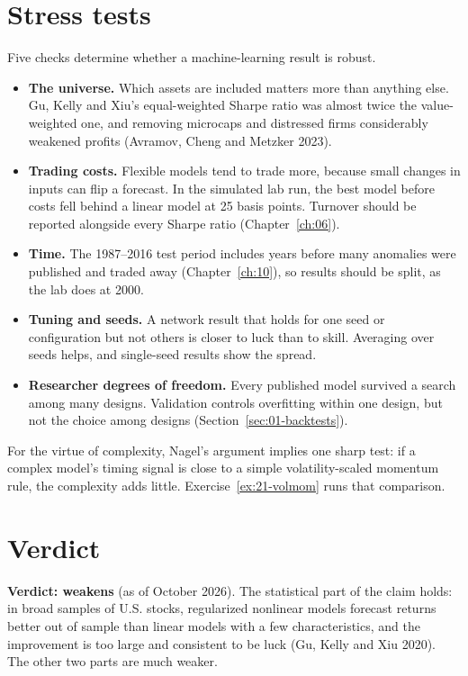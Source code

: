 \section{Stress tests}
\label{sec:21-stress}

Five checks determine whether a machine-learning result is robust.

\begin{itemize}
  \item \textbf{The universe.} Which assets are included matters more than anything else. Gu, Kelly and Xiu's equal-weighted Sharpe ratio was almost twice the value-weighted one, and removing microcaps and distressed firms considerably weakened profits (Avramov, Cheng and Metzker 2023).
  \item \textbf{Trading costs.} Flexible models tend to trade more, because small changes in inputs can flip a forecast. In the simulated lab run, the best model before costs fell behind a linear model at 25 basis points. Turnover should be reported alongside every Sharpe ratio (Chapter~\ref{ch:06}).
  \item \textbf{Time.} The 1987--2016 test period includes years before many anomalies were published and traded away (Chapter~\ref{ch:10}), so results should be split, as the lab does at 2000.
  \item \textbf{Tuning and seeds.} A network result that holds for one seed or configuration but not others is closer to luck than to skill. Averaging over seeds helps, and single-seed results show the spread.
  \item \textbf{Researcher degrees of freedom.} Every published model survived a search among many designs. Validation controls overfitting within one design, but not the choice among designs (Section~\ref{sec:01-backtests}).
\end{itemize}

For the virtue of complexity, Nagel's argument implies one sharp test: if a complex model's timing signal is close to a simple volatility-scaled momentum rule, the complexity adds little. Exercise~\ref{ex:21-volmom} runs that comparison.

\section{Verdict}
\label{sec:21-verdict}

\begin{callout}
\textbf{Verdict: weakens} (as of October 2026). The statistical part of the claim holds: in broad samples of U.S. stocks, regularized nonlinear models forecast returns better out of sample than linear models with a few characteristics, and the improvement is too large and consistent to be luck (Gu, Kelly and Xiu 2020). The other two parts are much weaker.
\end{callout}

